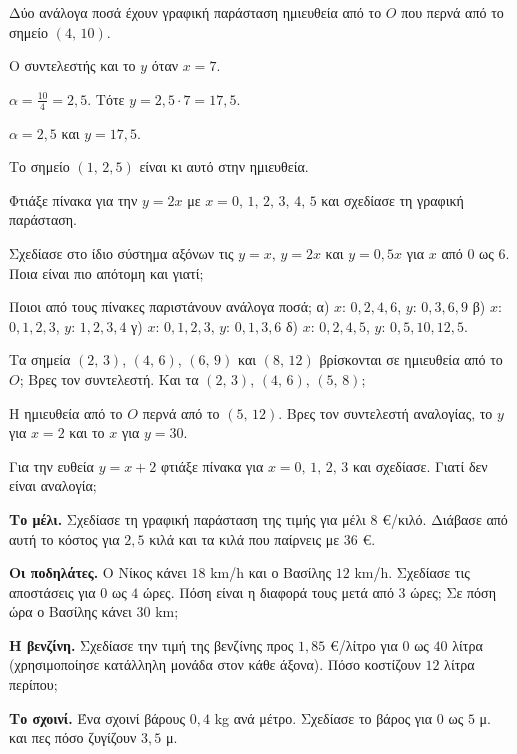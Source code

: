 \tixero Δύο ανάλογα ποσά έχουν γραφική παράσταση ημιευθεία από το $O$ που περνά από το σημείο $(4,\,10)$.\par
\tithelo Ο συντελεστής και το $y$ όταν $x=7$.\par
\possindeo $\alpha=\frac{10}{4}=2{,}5$. Τότε $y=2{,}5\cdot7=17{,}5$.\par
\apantisi $\alpha=2{,}5$ και $y=17{,}5$.\par
\elegxos Το σημείο $(1,\,2{,}5)$ είναι κι αυτό στην ημιευθεία.



\ex Φτιάξε πίνακα για την $y=2x$ με $x=0,\,1,\,2,\,3,\,4,\,5$ και σχεδίασε τη γραφική παράσταση.

\ex Σχεδίασε στο ίδιο σύστημα αξόνων τις $y=x$, $y=2x$ και $y=0{,}5x$ για $x$ από $0$ ως $6$. Ποια είναι πιο απότομη και γιατί;

\ex Ποιοι από τους πίνακες παριστάνουν ανάλογα ποσά; α) $x$: $0,2,4,6$, $y$: $0,3,6,9$ \quad β) $x$: $0,1,2,3$, $y$: $1,2,3,4$ \quad γ) $x$: $0,1,2,3$, $y$: $0,1,3,6$ \quad δ) $x$: $0,2,4,5$, $y$: $0,5,10,12{,}5$.

\ex Τα σημεία $(2,\,3)$, $(4,\,6)$, $(6,\,9)$ και $(8,\,12)$ βρίσκονται σε ημιευθεία από το $O$; Βρες τον συντελεστή. Και τα $(2,\,3)$, $(4,\,6)$, $(5,\,8)$;

\ex Η ημιευθεία από το $O$ περνά από το $(5,\,12)$. Βρες τον συντελεστή αναλογίας, το $y$ για $x=2$ και το $x$ για $y=30$.

\ex Για την ευθεία $y=x+2$ φτιάξε πίνακα για $x=0,\,1,\,2,\,3$ και σχεδίασε. Γιατί δεν είναι αναλογία;


\ex \textbf{Το μέλι.} Σχεδίασε τη γραφική παράσταση της τιμής για μέλι $8$ €/κιλό. Διάβασε από αυτή το κόστος για $2{,}5$ κιλά και τα κιλά που παίρνεις με $36$ €.

\ex \textbf{Οι ποδηλάτες.} Ο Νίκος κάνει $18$ km/h και ο Βασίλης $12$ km/h. Σχεδίασε τις αποστάσεις για $0$ ως $4$ ώρες. Πόση είναι η διαφορά τους μετά από $3$ ώρες; Σε πόση ώρα ο Βασίλης κάνει $30$ km;

\ex \textbf{Η βενζίνη.} Σχεδίασε την τιμή της βενζίνης προς $1{,}85$ €/λίτρο για $0$ ως $40$ λίτρα (χρησιμοποίησε κατάλληλη μονάδα στον κάθε άξονα). Πόσο κοστίζουν $12$ λίτρα περίπου;

\ex \textbf{Το σχοινί.} Ένα σχοινί βάρους $0{,}4$ kg ανά μέτρο. Σχεδίασε το βάρος για $0$ ως $5$ μ. και πες πόσο ζυγίζουν $3{,}5$ μ.


